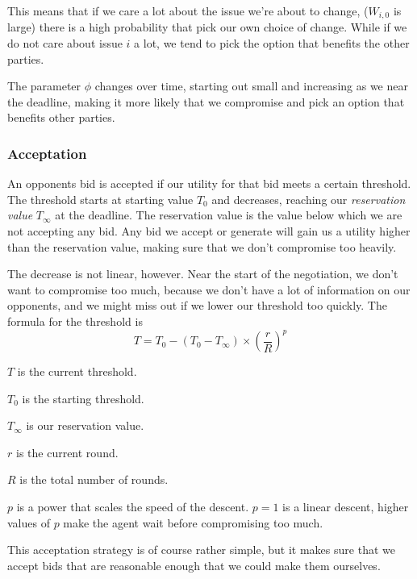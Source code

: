 \documentclass[a4,11pt]{scrartcl}
\let\tempone\itemize
\let\temptwo\enditemize
\renewenvironment{itemize}{\tempone\addtolength{\itemsep}{-0.5\baselineskip}}{\temptwo}
\begin{document}
This means that if we care a lot about the issue we're about to change,
($W_{i,0}$ is large) there is a high probability that pick our own
choice of change. While if we do not care about issue $i$ a lot, we
tend to pick the option that benefits the other parties.

The parameter $\phi$ changes over time, starting out small and 
increasing as we near the deadline, making it more likely that we 
compromise and pick an option that benefits other parties.


\subsubsection{Acceptation}

An opponents bid is accepted if our utility for that bid meets a 
certain threshold. The threshold starts at starting value $T_{0}$ and 
decreases, reaching our \emph{reservation value} $T_{\infty}$ at the 
deadline. The reservation value is the value below which we are not 
accepting any bid. Any bid we accept or generate will gain us a utility 
higher than the reservation value, making sure that we don't compromise 
too heavily.

The decrease is not linear, however. Near the start of the negotiation,
we don't want to compromise too much, because we don't have a lot of
information on our opponents, and we might miss out if we lower our
threshold too quickly. The formula for the threshold is
\begin{equation}
    T=T_{0}-(T_{0}-T_{\infty})\times\left(\frac{r}{R}\right)^{p}
\end{equation}
\begin{itemize}
    \item $T$ is the current threshold.
    \item $T_{0}$ is the starting threshold.
    \item $T_{\infty}$ is our reservation value.
    \item $r$ is the current round.
    \item $R$ is the total number of rounds.
    \item $p$ is a power that scales the speed of the descent. $p=1$ is
    a linear descent, higher values of $p$ make the agent wait before
    compromising too much.
\end{itemize}

This acceptation strategy is of course rather simple, but it makes sure
that we accept bids that are reasonable enough that we could make them
ourselves.
\end{document}
